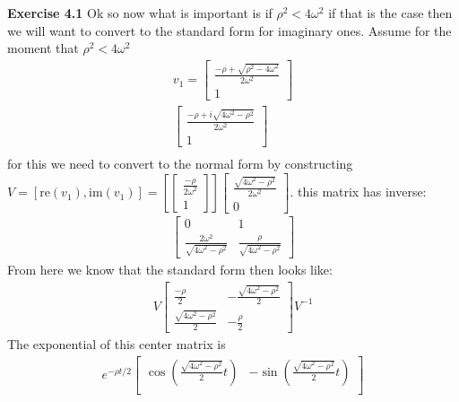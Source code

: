 \documentclass[12pt]{article}
\newenvironment{exercise}[1]{\vspace{.1in}\noindent\textbf{Exercise #1 \hspace{.05em}}}{}
\theoremstyle{definition}
\theoremstyle{remark}
\begin{document}
\begin{exercise}{4.1}
	Ok so now what is important is if $\rho^2<4\omega^2$ if that is the case then we will want to convert to the standard form for imaginary ones. Assume for the moment that $\rho^2<4\omega^2$
	\begin{align}
		v_1=%
		\begin{bmatrix}
			\frac{-\rho+\sqrt{\rho^2-4\omega^2}}{2\omega^2} \\
			1
		\end{bmatrix}  \\
		\begin{bmatrix}
			\frac{-\rho+i\sqrt{4\omega^2-\rho^2}}{2\omega^2} \\
			1
		\end{bmatrix} \\
	\end{align}
	for this we need to convert to the normal form by constructing $V=[\text{re}(v_1),\text{im}(v_1)]=[%
		\begin{bmatrix}
			\frac{-\rho}{2\omega^2} \\
			1
		\end{bmatrix}]%
		\begin{bmatrix}
			\frac{\sqrt{4\omega^2-\rho^2}}{2\omega^2} \\
			0
		\end{bmatrix}$. this matrix has inverse:
	\begin{align}
		\begin{bmatrix}
			0                                         & 1                                    \\
			\frac{2\omega^2}{\sqrt{4\omega^2-\rho^2}} & \frac{\rho}{\sqrt{4\omega^2-\rho^2}}
		\end{bmatrix}
	\end{align}
	From here we know that the standard form then looks like:
	\begin{align}
		V %
		\begin{bmatrix}
			\frac{-\rho}{2}                   & -\frac{\sqrt{4\omega^2-\rho^2}}{2} \\
			\frac{\sqrt{4\omega^2-\rho^2}}{2} & -\frac{\rho}{2}
		\end{bmatrix}V^{-1}
	\end{align}
	The exponential of this center matrix is
	\begin{align}
		e^{-\rho t/2} %
		\begin{bmatrix}
			\cos(\frac{\sqrt{4\omega^2-\rho^2}}{2} t) & -\sin(\frac{\sqrt{4\omega^2-\rho^2}}{2} t) \\

\end{bmatrix}
\end{align}
\end{exercise}
\end{document}
